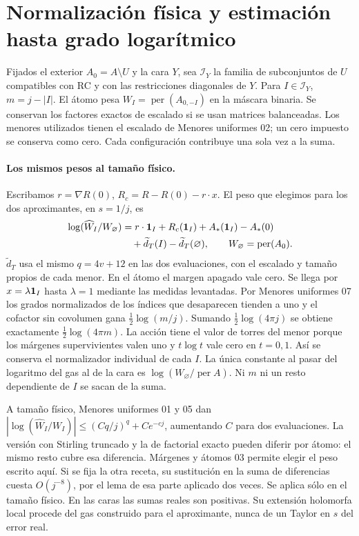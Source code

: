 \section{Normalización física y estimación hasta grado logarítmico}
Fijados el exterior $A_0=A\setminus U$ y la cara $Y$, sea $\mathcal I_Y$ la familia de
subconjuntos de $U$ compatibles con RC y con las restricciones diagonales de $Y$.
Para $I\in\mathcal I_Y$, $m=j-|I|$. El átomo pesa $W_I=\operatorname{per}(A_{0,-I})$
en la máscara binaria. Se conservan los factores exactos de escalado si se usan matrices
balanceadas. Los menores utilizados tienen el escalado de Menores uniformes 02; un cero
impuesto se conserva como cero. Cada configuración contribuye una sola vez a la suma.

\paragraph{Los mismos pesos al tamaño físico.}
Escribamos $r=\nabla R(0)$, $R_c=R-R(0)-r\cdot x$. El peso que elegimos para los dos
aproximantes, en $s=1/j$, es
\begin{align*}
 \log(\widehat W_I/W_\varnothing)
 &=r\cdot{\bf1}_I+R_c({\bf1}_I)
   +A_*({\bf1}_I)-A_*(0)\\
 &\quad+\widetilde d_T(I)-\widetilde d_T(\varnothing),\qquad
 W_\varnothing=\operatorname{per}(A_0).
\end{align*}
$\widetilde d_T$ usa el mismo $q=4v+12$ en las dos evaluaciones, con el escalado y tamaño
propios de cada menor. En el átomo el margen apagado vale cero. Se llega por
$x=\lambda{\bf1}_I$ hasta $\lambda=1$ mediante las medidas levantadas. Por Menores
uniformes 07 los grados normalizados de los índices que desaparecen tienden a uno y el
cofactor sin covolumen gana $\tfrac12\log(m/j)$. Sumando $\tfrac12\log(4\pi j)$ se
obtiene exactamente $\tfrac12\log(4\pi m)$. La acción tiene el valor de torres del menor
porque los márgenes supervivientes valen uno y $t\log t$ vale cero en $t=0,1$.
Así se conserva el normalizador individual de cada $I$. La única constante al pasar del
logaritmo del gas al de la cara es $\log(W_\varnothing/\operatorname{per}A)$.
Ni $m$ ni un resto dependiente de $I$ se sacan de la suma.

A tamaño físico, Menores uniformes 01 y 05 dan
$|\log(\widehat W_I/W_I)|\le(Cq/j)^q+Ce^{-cj}$, aumentando $C$ para dos evaluaciones.
La versión con Stirling truncado y la de factorial exacto pueden diferir por átomo:
el mismo resto cubre esa diferencia. Márgenes y átomos 03 permite elegir el peso escrito
aquí. Si se fija la otra receta, su sustitución en la suma de diferencias cuesta
$O(j^{-8})$, por el lema de esa parte aplicado dos veces. Se aplica sólo en el tamaño
físico. En las caras las sumas reales son positivas. Su extensión holomorfa local procede
del gas construido para el aproximante, nunca de un Taylor en $s$ del error real.

